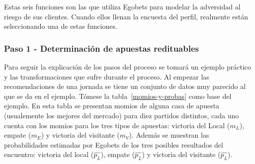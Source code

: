 Estas seis funciones son las que utiliza Egobets para modelar la adversidad al riesgo de sus clientes. Cuando ellos llenan la encuesta del perfil, realmente están seleccionando una de estas funciones.


\subsubsection{Paso 1 - Determinación de apuestas redituables}
\label{sec:paso-1}


Para seguir la explicación de los pasos del proceso se tomará un ejemplo práctico y las transformaciones que sufre durante el proceso. Al empezar las recomendaciones de una jornada se tiene un conjunto de datos muy parecido al que se da en el ejemplo. Tómese la tabla~\ref{momios-y-probas} como base del ejemplo. En esta tabla se presentan momios de alguna casa de apuesta (usualemente los mejores del mercado) para diez partidos distintos, cada uno cuenta con los momios para los tres tipos de apuestas: victoria del Local ($m_L$), empate ($m_E$) y victoria del visitante ($m_V$). Además se muestran las probabilidades estimadas por Egobets de los tres posibles resultados del encuentro: victoria del local ($\hat{p_L}$), empate ($\hat{p_L}$) y victoria del visitante ($\hat{p_L}$).

\begin{table}[h]
\centering
{}
\caption{Diez partidos con sus respectivos momios y las probabilidades estimadas por Egobets}
\label{momios-y-probas}
\end{table}

